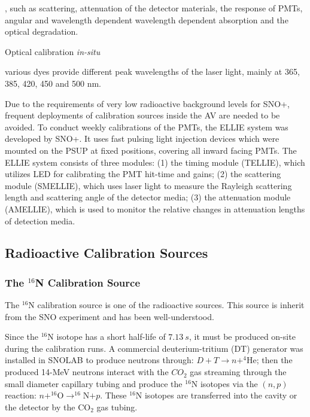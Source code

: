 , such as scattering, attenuation of the detector materials, the response of PMTs, angular and wavelength dependent wavelength dependent absorption and the optical degradation.

Optical calibration {\emph {in-situ}} 

various dyes provide different peak wavelengths of the laser light, mainly at 365, 385, 420, 450 and 500 nm.

Due to the requirements of very low radioactive background levels for SNO+, frequent deployments of calibration sources inside the AV are needed to be avoided. To conduct weekly calibrations of the PMTs, the ELLIE system was developed by SNO+. It uses fast pulsing light injection devices which were mounted on the PSUP at fixed positions, covering all inward facing PMTs. The ELLIE system consists of three modules: (1) the timing module (TELLIE), which utilizes LED for calibrating the PMT hit-time and gains; (2) the scattering module (SMELLIE), which uses laser light to measure the Rayleigh scattering length and scattering angle of the detector media; (3) the attenuation module (AMELLIE), which is used to monitor the relative changes in attenuation lengths of detection media\cite{snop_jinst,jones2011background,walker2016study,dunger2018topological}.

\subsection{Radioactive Calibration Sources}
\subsubsection{The $^{16}$N Calibration Source}\label{n16_description}
The $^{16}$N calibration source is one of the radioactive sources. This source is inherit from the SNO experiment and has been well-understood\cite{dragowsky1999sudbury,dragowsky200216n,hamer2001energy}.   

Since the $^{16}$N isotope has a short half-life of $7.13~s$, it must be produced on-site during the calibration runs. A commercial deuterium-tritium (DT) generator was installed in SNOLAB to produce neutrons through: $D+T\to n+^{4}$He; then the produced 14-MeV neutrons interact with the $CO_2$ gas streaming through the small diameter capillary tubing and produce the $^{16}$N isotopes via the $(n,p)$ reaction: $n+^{16}$O$\to^{16}$N$+p$. These $^{16}$N isotopes are transferred into the cavity or the detector by the CO$_2$ gas tubing\cite{dragowsky200216n}.  

